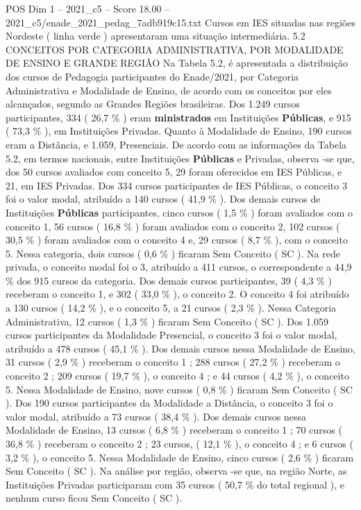 \begin{textsample}{POS Dim 1 – 2021\_c5 – Score 18.00 – 2021\_c5/enade\_2021\_pedag\_7adb919c15.txt}
Cursos em IES situadas nas regiões Nordeste ( linha verde ) apresentaram uma situação intermediária. 5.2 CONCEITOS POR CATEGORIA ADMINISTRATIVA, POR MODALIDADE DE ENSINO E GRANDE REGIÃO Na Tabela 5.2, é apresentada a distribuição dos cursos de Pedagogia participantes do Enade/2021, por Categoria Administrativa e Modalidade de Ensino, de acordo com os conceitos por eles alcançados, segundo as Grandes Regiões brasileiras.
Dos 1.249 cursos participantes, 334 ( 26,7 \% ) eram \textbf{ministrados} em Instituições \textbf{Públicas}, e 915 ( 73,3 \% ), em Instituições Privadas.
Quanto à Modalidade de Ensino, 190 cursos eram a Distância, e 1.059, Presenciais.
De acordo com as informações da Tabela 5.2, em termos nacionais, entre Instituições \textbf{Públicas} e Privadas, observa -se que, dos 50 cursos avaliados com conceito 5, 29 foram oferecidos em IES Públicas, e 21, em IES Privadas.
Dos 334 cursos participantes de IES Públicas, o conceito 3 foi o valor modal, atribuído a 140 cursos ( 41,9 \% ).
Dos demais cursos de Instituições \textbf{Públicas} participantes, cinco cursos ( 1,5 \% ) foram avaliados com o conceito 1, 56 cursos ( 16,8 \% ) foram avaliados com o conceito 2, 102 cursos ( 30,5 \% ) foram avaliados com o conceito 4 e, 29 cursos ( 8,7 \% ), com o conceito 5.
Nessa categoria, dois cursos ( 0,6 \% ) ficaram Sem Conceito ( SC ).
Na rede privada, o conceito modal foi o 3, atribuído a 411 cursos, o correspondente a 44,9 \% dos 915 cursos da categoria.
Dos demais cursos participantes, 39 ( 4,3 \% ) receberam o conceito 1, e 302 ( 33,0 \% ), o conceito 2.
O conceito 4 foi atribuído a 130 cursos ( 14,2 \% ), e o conceito 5, a 21 cursos ( 2,3 \% ).
Nessa Categoria Administrativa, 12 cursos ( 1,3 \% ) ficaram Sem Conceito ( SC ).
Dos 1.059 cursos participantes da Modalidade Presencial, o conceito 3 foi o valor modal, atribuído a 478 cursos ( 45,1 \% ).
Dos demais cursos nessa Modalidade de Ensino, 31 cursos ( 2,9 \% ) receberam o conceito 1 ; 288 cursos ( 27,2 \% ) receberam o conceito 2 ; 209 cursos ( 19,7 \% ), o conceito 4 ; e 44 cursos ( 4,2 \% ), o conceito 5.
Nessa Modalidade de Ensino, nove cursos ( 0,8 \% ) ficaram Sem Conceito ( SC ).
Dos 190 cursos participantes da Modalidade a Distância, o conceito 3 foi o valor modal, atribuído a 73 cursos ( 38,4 \% ).
Dos demais cursos nessa Modalidade de Ensino, 13 cursos ( 6,8 \% ) receberam o conceito 1 ; 70 cursos ( 36,8 \% ) receberam o conceito 2 ; 23 cursos, ( 12,1 \% ), o conceito 4 ; e 6 cursos ( 3,2 \% ), o conceito 5.
Nessa Modalidade de Ensino, cinco cursos ( 2,6 \% ) ficaram Sem Conceito ( SC ).
Na análise por região, observa -se que, na região Norte, as Instituições Privadas participaram com 35 cursos ( 50,7 \% do total regional ), e nenhum curso ficou Sem Conceito ( SC ).

\end{textsample}
